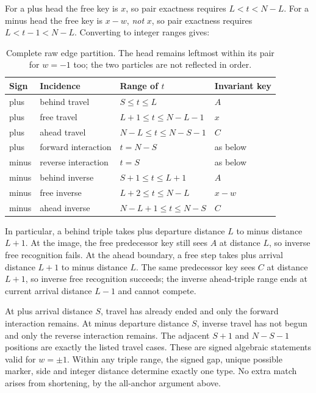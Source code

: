 \documentclass[11pt,a4paper]{article}
\numberwithin{equation}{section}
\begin{document}
For a plus head the free key is $x$, so pair exactness requires $L<t<N-L$. For a minus head the free key is $x-w$, \emph{not} $x$, so pair exactness requires $L<t-1<N-L$. Converting to integer ranges gives:
\begin{table}[htbp]\centering\small
\begin{tabular}{llll}\toprule
Sign & Incidence & Range of $t$ & Invariant key\\\midrule
plus & behind travel & $S\le t\le L$ & $A$\\
plus & free travel & $L+1\le t\le N-L-1$ & $x$\\
plus & ahead travel & $N-L\le t\le N-S-1$ & $C$\\
plus & forward interaction & $t=N-S$ & as below\\\midrule
minus & reverse interaction & $t=S$ & as below\\
minus & behind inverse & $S+1\le t\le L+1$ & $A$\\
minus & free inverse & $L+2\le t\le N-L$ & $x-w$\\
minus & ahead inverse & $N-L+1\le t\le N-S$ & $C$\\\bottomrule
\end{tabular}
\caption{Complete raw edge partition. The head remains leftmost within its pair for $w=-1$ too; the two particles are not reflected in order.}
\label{fpa:sw:tab:corridor}
\end{table}

In particular, a behind triple takes plus departure distance $L$ to minus distance $L+1$. At the image, the free predecessor key still sees $A$ at distance $L$, so inverse free recognition fails. At the ahead boundary, a free step takes plus arrival distance $L+1$ to minus distance $L$. The same predecessor key sees $C$ at distance $L+1$, so inverse free recognition succeeds; the inverse ahead-triple range ends at current arrival distance $L-1$ and cannot compete.

At plus arrival distance $S$, travel has already ended and only the forward interaction remains. At minus departure distance $S$, inverse travel has not begun and only the reverse interaction remains. The adjacent $S+1$ and $N-S-1$ positions are exactly the listed travel cases. These are signed algebraic statements valid for $w=\pm1$. Within any triple range, the signed gap, unique possible marker, side and integer distance determine exactly one type. No extra match arises from shortening, by the all-anchor argument above.
\end{document}
